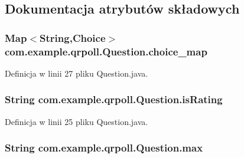 \subsection{Dokumentacja atrybutów składowych}
\hypertarget{classcom_1_1example_1_1qrpoll_1_1_question_aa382153815db46e065ab637ef86f9265}{
\subsubsection[{choice\+\_\+map}]{\setlength{\rightskip}{0pt plus 5cm}Map$<$String,{\bf Choice}$>$ com.\+example.\+qrpoll.\+Question.\+choice\+\_\+map\hspace{0.3cm}{\ttfamily [private]}}}\label{classcom_1_1example_1_1qrpoll_1_1_question_aa382153815db46e065ab637ef86f9265}


Definicja w linii 27 pliku Question.\+java.

\hypertarget{classcom_1_1example_1_1qrpoll_1_1_question_a7b9016a004baf976a3d700ce332c0e1b}{
\subsubsection[{is\+Rating}]{\setlength{\rightskip}{0pt plus 5cm}String com.\+example.\+qrpoll.\+Question.\+is\+Rating\hspace{0.3cm}{\ttfamily [private]}}}\label{classcom_1_1example_1_1qrpoll_1_1_question_a7b9016a004baf976a3d700ce332c0e1b}


Definicja w linii 25 pliku Question.\+java.

\hypertarget{classcom_1_1example_1_1qrpoll_1_1_question_a07bd283882253cc7c9ab69718a692a64}{
\subsubsection[{max}]{\setlength{\rightskip}{0pt plus 5cm}String com.\+example.\+qrpoll.\+Question.\+max\hspace{0.3cm}{\ttfamily [private]}}}\label{classcom_1_1example_1_1qrpoll_1_1_question_a07bd283882253cc7c9ab69718a692a64}


